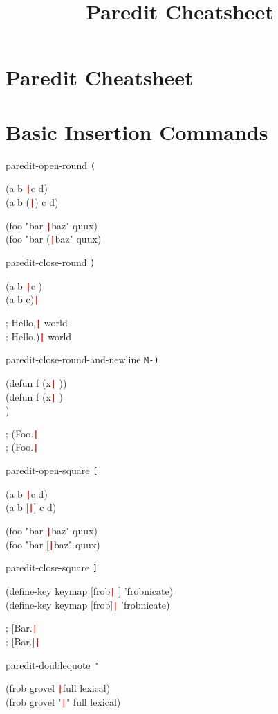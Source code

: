 \documentclass[10pt,landscape,a4paper]{article}
\title{Paredit Cheatsheet}
\begin{document}
  \newcommand{\cursor}{\texttt{\textcolor{red}{\textbf{|}}}}

  \begin{multicols}{4}

    \section*{\Large{Paredit Cheatsheet}}

    \section*{\large{Basic Insertion Commands}}

paredit-open-round \texttt{(}

{\ttfamily
(a b \cursor c d)\\
(a b (\cursor) c d)

(foo "bar \cursor baz" quux)\\
(foo "bar (\cursor baz" quux)
}

paredit-close-round \texttt{)}

{\ttfamily
(a b \cursor c \space\space)\\
(a b c)\cursor

; Hello,\cursor{} world\\
; Hello,)\cursor{} world
}

paredit-close-round-and-newline \texttt{M-)}

{\ttfamily
(defun f (x\cursor{} \space))\\
(defun f (x\cursor{} \space)\\
)

; (Foo.\cursor\\
; (Foo.\cursor
}

paredit-open-square \texttt{[}

{\ttfamily
(a b \cursor c d)\\
(a b [\cursor] c d)

(foo "bar \cursor baz" quux)\\
(foo "bar [\cursor baz" quux)
}

paredit-close-square \texttt{]}

{\ttfamily
(define-key keymap [frob\cursor{} \space] 'frobnicate)\\
(define-key keymap [frob]\cursor{} 'frobnicate)

; [Bar.\cursor\\
; [Bar.]\cursor
}

paredit-doublequote \texttt{"}

{\ttfamily
(frob grovel \cursor full lexical)\\
(frob grovel "\cursor " full lexical)

}
\end{multicols}
\end{document}
